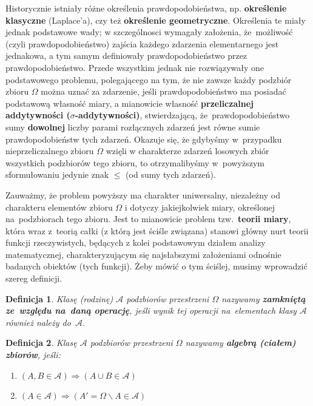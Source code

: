 \documentclass[10pt,a4paper]{article}
\newtheorem{definition}{Definicja}[section]
\begin{document}
Historycznie istniały różne określenia prawdopodobieństwa, np. \textbf{określenie
  klasyczne} (Laplace'a), czy też \textbf{określenie geometryczne}. Określenia
te miały jednak podstawowe wady; w szczególnosci wymagały założenia, że~możliwość
(czyli prawdopodobieństwo) zajścia każdego zdarzenia elementarnego jest jednakowa,
a tym samym definiowały prawdopodobieństwo przez prawdopodobieństwo. Przede
wszystkim jednak nie rozwiązywały one podstawowego problemu, polegającego na tym,
że nie zawsze każdy podzbiór zbioru $\Omega$ można uznać za zdarzenie, jeśli
prawdopodobieństwo ma posiadać podstawową własność miary, a mianowicie własność
\textbf{przeliczalnej addytywności ($\sigma$-addytywności)}, stwierdzającą,
że~prawdopodobieństwo sumy \textbf{dowolnej} liczby parami rozłącznych zdarzeń
jest równe sumie prawdopodobieństw tych zdarzeń. Okazuje się, że gdybyśmy
w~przypadku nieprzeliczalnego zbioru $\Omega$ wzięli w charakterze zdarzeń
losowych zbiór wszystkich podzbiorów tego zbioru, to otrzymalibyśmy w~powyższym
sformułowaniu jedynie znak $\leq$ (od sumy tych zdarzeń).

Zauważmy, że problem powyższy ma charakter uniwersalny, niezależny od charakteru
elementów zbioru $\Omega$ i dotyczy jakiejkolwiek miary, określonej
na~podzbiorach tego zbioru. Jest to mianowicie problem tzw.~\textbf{teorii miary},
która wraz z~teorią całki (z którą jest ściśle związana) stanowi główny nurt
teorii funkcji rzeczywistych, będących z kolei podstawowym działem analizy
matematycznej, charakteryzującym się najsłabszymi założeniami odnośnie badanych
obiektów (tych funkcji). Żeby mówić o tym ściślej, musimy wprowadzić szereg
definicji.

\begin{definition}
  Klasę (rodzinę) $\mathscr{A}$ podzbiorów przestrzeni $\Omega$ nazywamy
  \textbf{zamkniętą ze~względu na~daną operację}, jeśli wynik tej operacji
  na~elementach klasy $\mathscr{A}$ również należy do~$\mathscr{A}$.
\end{definition}

\begin{definition}
  Klasę $\mathscr{A}$ podzbiorów przestrzeni $\Omega$ nazywamy \textbf{algebrą
    (ciałem) zbiorów}, jeśli:
  \begin{enumerate}
  \item[1$^\circ$] $(A, B \in\mathscr{A}) \Longrightarrow (A\cup B \in \mathscr{A})$
  \item[2$^\circ$] $(A\in\mathscr{A})\Longrightarrow (A'=\Omega \backslash A
    \in \mathscr{A})$
  \end{enumerate}
\end{definition}
\end{document}
